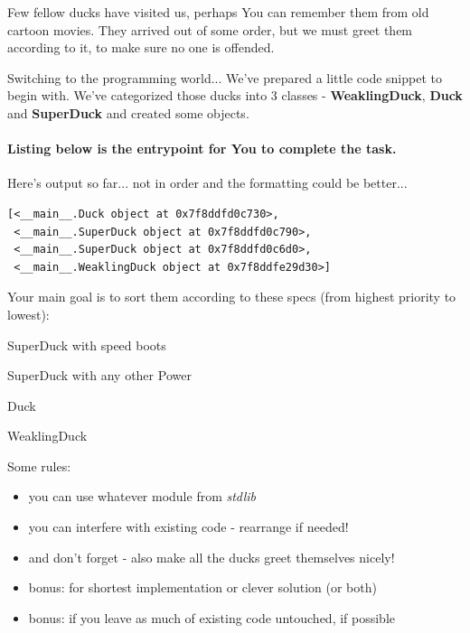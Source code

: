 \documentclass[12pt]{article}
\begin{document}
\vspace{1cm}
\begin{flushleft}
Few fellow ducks have visited us, perhaps You can remember them from old cartoon movies.
They arrived out of some order, but we must greet them according to it, to make sure no one is offended.

Switching to the programming world... We've prepared a little code snippet to begin with. We've categorized those ducks into 3 classes - \textbf{WeaklingDuck}, \textbf{Duck} and \textbf{SuperDuck} and created some objects.

\paragraph{Listing below is the entrypoint for You to complete the task.}

\begin{footnotesize}

\end{footnotesize}
\vspace{1cm}

Here's output so far... not in order and the formatting could be better...
\begin{verbatim}
[<__main__.Duck object at 0x7f8ddfd0c730>,
 <__main__.SuperDuck object at 0x7f8ddfd0c790>,
 <__main__.SuperDuck object at 0x7f8ddfd0c6d0>,
 <__main__.WeaklingDuck object at 0x7f8ddfe29d30>]
\end{verbatim}

Your main goal is to sort them according to these specs (from highest priority to lowest):
\vspace{0.5cm}

\begingroup
\footnotesize
SuperDuck with speed boots
\succ

SuperDuck with any other Power
\succ

Duck
\succ

WeaklingDuck
\endgroup

\vspace{1cm}

Some rules:
\begin{itemize}
  \item you can use whatever module from \textit{stdlib}
  \item you can interfere with existing code - rearrange if needed!
  \item and don't forget - also make all the ducks greet themselves nicely!
  \item bonus: for shortest implementation or clever solution (or both)
  \item bonus: if you leave as much of existing code untouched, if possible
\end{itemize}

\end{flushleft}
\end{document}
